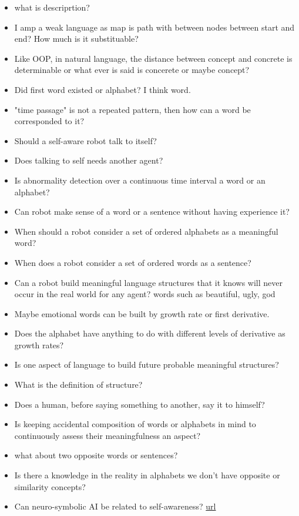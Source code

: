 \begin{itemize}
    \item what is descriprtion?
    \item I amp a weak language as map is path with between nodes between start and end? How much is it substituable?
    \item Like OOP, in natural language, the distance between concept and concrete is determinable or what ever is said is concerete or maybe concept?
    \item Did first word existed or alphabet? I think word.
    \item "time passage" is not a repeated pattern, then how can a word be corresponded to it?
    \item Should a self-aware robot talk to itself?
    \item Does talking to self needs another agent?
    \item Is abnormality detection over a continuous time interval a word or an alphabet?
    \item Can robot make sense of a word or a sentence without having experience it?
    \item When should a robot consider a set of ordered alphabets as a meaningful word?
    \item When does a robot consider a set of ordered words as a sentence?
    \item Can a robot build meaningful language structures that it knows will never occur in the real world for any agent? words such as beautiful, ugly, god
    \item Maybe emotional words can be built by growth rate or first derivative.
    \item Does the alphabet have anything to do with different levels of derivative as growth rates?
    \item Is one aspect of language to build future probable meaningful structures?
    \item What is the definition of structure?
    \item Does a human, before saying something to another, say it to himself?
    \item Is keeping accidental composition of words or alphabets in mind to continuously assess their meaningfulness an aspect?
    \item what about two opposite words or sentences?
    \item Is there a knowledge in the reality in alphabets we don't have opposite or similarity concepts?
    \item Can neuro-symbolic AI be related to self-awareness? \href{https://en.wikipedia.org/wiki/Neuro-symbolic_AI}{url}

\end{itemize}
